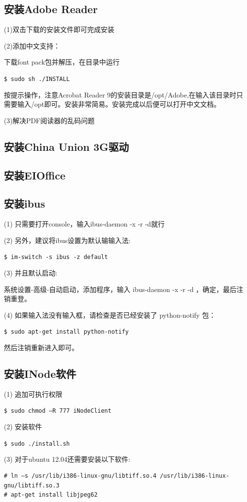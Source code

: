 \subsection{安装Adobe Reader}
(1)双击下载的安装文件即可完成安装

(2)添加中文支持：

下载font pack包并解压，在目录中运行

\verb"$ sudo sh ./INSTALL"

按提示操作，注意Acrobat Reader 9的安装目录是/opt/Adobe,在输入该目录时只需要输入/opt即可。安装非常简易。安装完成以后便可以打开中文文档。
		
(3)解决PDF阅读器的乱码问题

\subsection{安装China Union 3G驱动}

\subsection{安装EIOffice}

\subsection{安装ibus}
(1) 只需要打开console，输入ibus-daemon -x -r -d就行 

(2) 另外，建议将ibus设置为默认输输入法:

\verb"$ im-switch -s ibus -z default"

(3) 并且默认启动:

系统设置-高级-自动启动，添加程序，输入 ibus-daemon -x -r -d ，确定，最后注销重登。

(4) 如果输入法没有输入框，请检查是否已经安装了 python-notify 包：

\verb"$ sudo apt-get install python-notify"

然后注销重新进入即可。

\subsection {安装INode软件}
(1) 追加可执行权限

\verb"$ sudo chmod –R 777 iNodeClient"

(2) 安装软件

\verb"$ sudo ./install.sh"

(3) 对于ubuntu 12.04还需要安装以下软件:
\begin{verbatim}
# ln –s /usr/lib/i386-linux-gnu/libtiff.so.4 /usr/lib/i386-linux-gnu/libtiff.so.3
# apt-get install libjpeg62
\end{verbatim}

